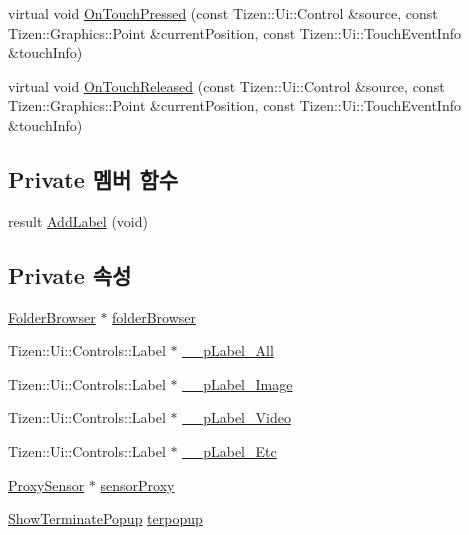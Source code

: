 \begin{DoxyCompactItemize}
\item 
virtual void \hyperlink{class_browser_tab2_ab580d95b8bd22c671658eefe0f86a4d0}{On\+Touch\+Pressed} (const Tizen\+::\+Ui\+::\+Control \&source, const Tizen\+::\+Graphics\+::\+Point \&current\+Position, const Tizen\+::\+Ui\+::\+Touch\+Event\+Info \&touch\+Info)
\item 
virtual void \hyperlink{class_browser_tab2_aeaa1e88727259fb15a64a174cabfd28a}{On\+Touch\+Released} (const Tizen\+::\+Ui\+::\+Control \&source, const Tizen\+::\+Graphics\+::\+Point \&current\+Position, const Tizen\+::\+Ui\+::\+Touch\+Event\+Info \&touch\+Info)
\end{DoxyCompactItemize}
\subsection*{Private 멤버 함수}
\begin{DoxyCompactItemize}
\item 
result \hyperlink{class_browser_tab2_ae7af5df5c2748e3b57e3c78f4543d167}{Add\+Label} (void)
\end{DoxyCompactItemize}
\subsection*{Private 속성}
\begin{DoxyCompactItemize}
\item 
\hyperlink{class_folder_browser}{Folder\+Browser} $\ast$ \hyperlink{class_browser_tab2_ae1cb54bfa632e894ff9bb34042e70bec}{folder\+Browser}
\item 
Tizen\+::\+Ui\+::\+Controls\+::\+Label $\ast$ \hyperlink{class_browser_tab2_ae52cf0e5fed4756ecf9d4f83a4676ef1}{\+\_\+\+\_\+p\+Label\+\_\+\+All}
\item 
Tizen\+::\+Ui\+::\+Controls\+::\+Label $\ast$ \hyperlink{class_browser_tab2_abb8202996c81f3ac04d4ea2fd9f168a7}{\+\_\+\+\_\+p\+Label\+\_\+\+Image}
\item 
Tizen\+::\+Ui\+::\+Controls\+::\+Label $\ast$ \hyperlink{class_browser_tab2_a7768e46f5a505aaa85e5ce199df7c8fc}{\+\_\+\+\_\+p\+Label\+\_\+\+Video}
\item 
Tizen\+::\+Ui\+::\+Controls\+::\+Label $\ast$ \hyperlink{class_browser_tab2_a108831e016d3f9f353d885156029d1d4}{\+\_\+\+\_\+p\+Label\+\_\+\+Etc}
\item 
\hyperlink{class_proxy_sensor}{Proxy\+Sensor} $\ast$ \hyperlink{class_browser_tab2_acdb2087a425df9397078e186c10ccdda}{sensor\+Proxy}
\item 
\hyperlink{class_show_terminate_popup}{Show\+Terminate\+Popup} \hyperlink{class_browser_tab2_a50b6f9c7103581c30b6a3729f80af987}{terpopup}
\end{DoxyCompactItemize}


